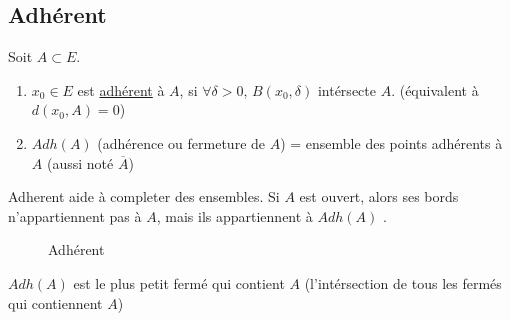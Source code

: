 \subsection{Adhérent}
\begin{definition}
    Soit $A \subset E$. 
    \begin{enumerate}
        \item $x_0 \in E$ est \underline{adhérent} à $A$, si  $\forall \delta > 0, \, B(x_0, \delta)$ intérsecte $A$. (équivalent à $d(x_0, A) = 0$)
        \item $Adh(A)$ (adhérence ou fermeture de $A$) = ensemble des points adhérents à $A$ (aussi noté $\overline{A}$)
    \end{enumerate}
\end{definition}
\begin{intuition}
   Adherent aide à completer des ensembles. Si $A$ est ouvert, alors ses bords n'appartiennent pas à  $A$, mais ils appartiennent à  $Adh(A)$ .
\end{intuition}
\begin{figure}[H]
   \centering 
    \caption{Adhérent}
\end{figure}
\begin{prop}
   $Adh(A)$ est le plus petit fermé qui contient $A$ (l'intérsection de tous les fermés qui contiennent $A$)
\end{prop}
